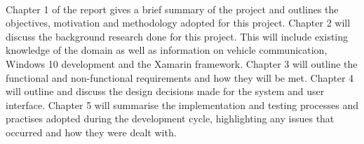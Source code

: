 	\paragraph{}{
	Chapter 1 of the report gives a brief summary of the project and outlines the objectives, motivation and methodology adopted for this project. Chapter 2 will discuss the background research done for this project. This will include existing knowledge of the domain as well as information on vehicle communication, Windows 10 development and the Xamarin framework. Chapter 3 will outline the functional and non-functional requirements and how they will be met. Chapter 4 will outline and discuss the design decisions made for the system and user interface. Chapter 5 will summarise the implementation and testing processes and practises adopted during the development cycle, highlighting any issues that occurred and how they were dealt with.
	}	
